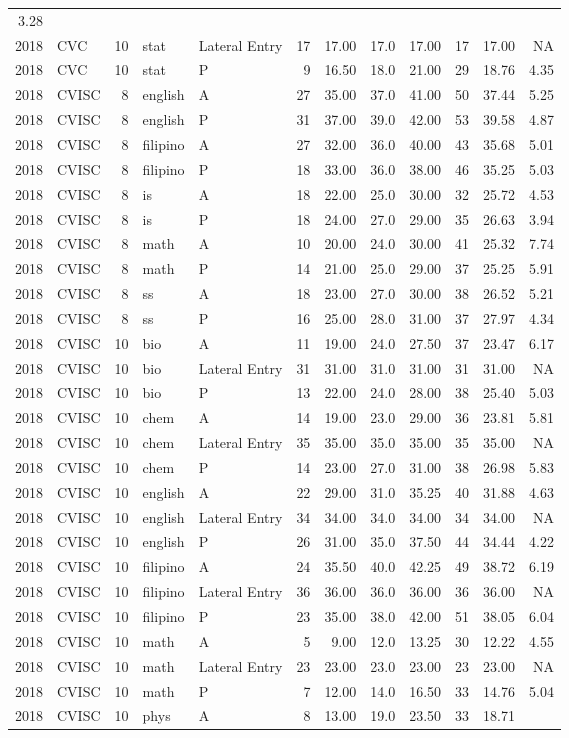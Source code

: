 \documentclass[]{article}
\begin{document}
\begin{longtable}[]{@{}rlrllrrrrrrr@{}}
3.28\tabularnewline
2018 & CVC & 10 & stat & Lateral Entry & 17 & 17.00 & 17.0 & 17.00 & 17
& 17.00 & NA\tabularnewline
2018 & CVC & 10 & stat & P & 9 & 16.50 & 18.0 & 21.00 & 29 & 18.76 &
4.35\tabularnewline
2018 & CVISC & 8 & english & A & 27 & 35.00 & 37.0 & 41.00 & 50 & 37.44
& 5.25\tabularnewline
2018 & CVISC & 8 & english & P & 31 & 37.00 & 39.0 & 42.00 & 53 & 39.58
& 4.87\tabularnewline
2018 & CVISC & 8 & filipino & A & 27 & 32.00 & 36.0 & 40.00 & 43 & 35.68
& 5.01\tabularnewline
2018 & CVISC & 8 & filipino & P & 18 & 33.00 & 36.0 & 38.00 & 46 & 35.25
& 5.03\tabularnewline
2018 & CVISC & 8 & is & A & 18 & 22.00 & 25.0 & 30.00 & 32 & 25.72 &
4.53\tabularnewline
2018 & CVISC & 8 & is & P & 18 & 24.00 & 27.0 & 29.00 & 35 & 26.63 &
3.94\tabularnewline
2018 & CVISC & 8 & math & A & 10 & 20.00 & 24.0 & 30.00 & 41 & 25.32 &
7.74\tabularnewline
2018 & CVISC & 8 & math & P & 14 & 21.00 & 25.0 & 29.00 & 37 & 25.25 &
5.91\tabularnewline
2018 & CVISC & 8 & ss & A & 18 & 23.00 & 27.0 & 30.00 & 38 & 26.52 &
5.21\tabularnewline
2018 & CVISC & 8 & ss & P & 16 & 25.00 & 28.0 & 31.00 & 37 & 27.97 &
4.34\tabularnewline
2018 & CVISC & 10 & bio & A & 11 & 19.00 & 24.0 & 27.50 & 37 & 23.47 &
6.17\tabularnewline
2018 & CVISC & 10 & bio & Lateral Entry & 31 & 31.00 & 31.0 & 31.00 & 31
& 31.00 & NA\tabularnewline
2018 & CVISC & 10 & bio & P & 13 & 22.00 & 24.0 & 28.00 & 38 & 25.40 &
5.03\tabularnewline
2018 & CVISC & 10 & chem & A & 14 & 19.00 & 23.0 & 29.00 & 36 & 23.81 &
5.81\tabularnewline
2018 & CVISC & 10 & chem & Lateral Entry & 35 & 35.00 & 35.0 & 35.00 &
35 & 35.00 & NA\tabularnewline
2018 & CVISC & 10 & chem & P & 14 & 23.00 & 27.0 & 31.00 & 38 & 26.98 &
5.83\tabularnewline
2018 & CVISC & 10 & english & A & 22 & 29.00 & 31.0 & 35.25 & 40 & 31.88
& 4.63\tabularnewline
2018 & CVISC & 10 & english & Lateral Entry & 34 & 34.00 & 34.0 & 34.00
& 34 & 34.00 & NA\tabularnewline
2018 & CVISC & 10 & english & P & 26 & 31.00 & 35.0 & 37.50 & 44 & 34.44
& 4.22\tabularnewline
2018 & CVISC & 10 & filipino & A & 24 & 35.50 & 40.0 & 42.25 & 49 &
38.72 & 6.19\tabularnewline
2018 & CVISC & 10 & filipino & Lateral Entry & 36 & 36.00 & 36.0 & 36.00
& 36 & 36.00 & NA\tabularnewline
2018 & CVISC & 10 & filipino & P & 23 & 35.00 & 38.0 & 42.00 & 51 &
38.05 & 6.04\tabularnewline
2018 & CVISC & 10 & math & A & 5 & 9.00 & 12.0 & 13.25 & 30 & 12.22 &
4.55\tabularnewline
2018 & CVISC & 10 & math & Lateral Entry & 23 & 23.00 & 23.0 & 23.00 &
23 & 23.00 & NA\tabularnewline
2018 & CVISC & 10 & math & P & 7 & 12.00 & 14.0 & 16.50 & 33 & 14.76 &
5.04\tabularnewline
2018 & CVISC & 10 & phys & A & 8 & 13.00 & 19.0 & 23.50 & 33 & 18.71 &

\end{longtable}
\end{document}
